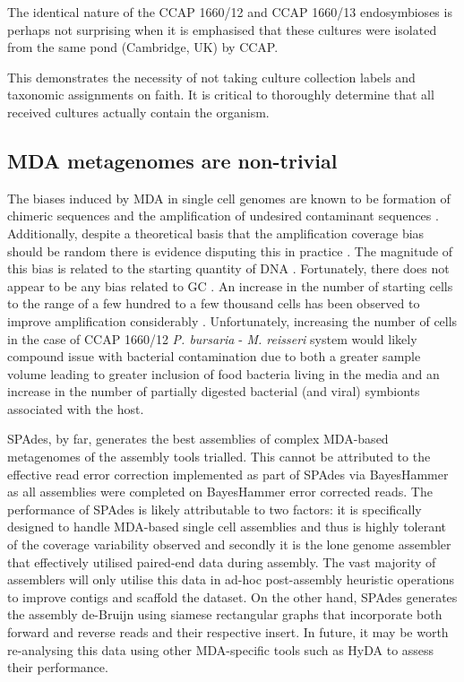 The identical nature of the CCAP 1660/12 and CCAP 1660/13 endosymbioses is perhaps not surprising
when it is emphasised that these cultures were isolated from the same
pond (Cambridge, UK) by CCAP. 

This demonstrates the necessity of not taking culture collection labels and taxonomic
assignments on faith. It is critical to thoroughly determine that all received
cultures actually contain the organism.

\subsection{MDA metagenomes are non-trivial}

The biases induced by MDA in single cell genomes are known to be 
formation of chimeric sequences and the amplification
of undesired contaminant sequences \citep{Binga2008}.
Additionally, despite a theoretical basis that
the amplification coverage bias should be random \citep{Hosono2003}
there is evidence disputing this in practice \citep{Ellegaard2013}.
The magnitude of this bias is related to the starting
quantity of DNA \citep{Ellegaard2013a}.
Fortunately, there does not appear to be any bias
related to GC \citep{Ellegaard2013a}.
An increase in the number of starting cells to the range of
a few hundred to a few thousand cells
has been observed to improve amplification considerably \citep{Ellegaard2013a}. 
Unfortunately, increasing the number of cells in the case
of CCAP 1660/12 \textit{P. bursaria} - \textit{M. reisseri} system
would likely compound issue with bacterial contamination due 
to both a greater sample volume leading to greater inclusion
of food bacteria living in the media and an increase in the
number of partially digested bacterial (and viral) symbionts
associated with the host. 

SPAdes, by far, generates the best assemblies of complex
MDA-based metagenomes of the assembly tools trialled. 
This cannot be attributed to the effective read error correction
implemented as part of SPAdes via BayesHammer as all assemblies
were completed on BayesHammer error corrected reads. The performance
of SPAdes is likely attributable to two factors: it is specifically
designed to handle MDA-based single cell assemblies and thus is 
highly tolerant of the coverage variability observed and secondly
it is the lone genome assembler that effectively utilised
paired-end data during assembly.  The vast majority of assemblers
will only utilise this data in ad-hoc post-assembly heuristic operations
to improve contigs and scaffold the dataset.  On the other hand,
SPAdes generates the assembly de-Bruijn using siamese rectangular
graphs that incorporate both forward and reverse reads and their 
respective insert. 
In future, it may be worth re-analysing this data using
other MDA-specific tools such as HyDA to assess their performance. 

